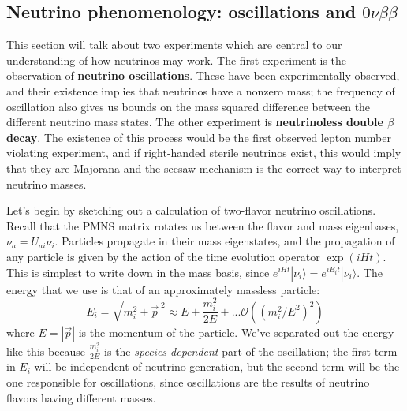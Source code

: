 \documentclass[11pt, oneside]{article}   	%
\theoremstyle{definition}
\numberwithin{equation}{subsection}		%
\begin{document}
\subsection{Neutrino phenomenology: oscillations and $0\nu\beta\beta$}

This section will talk about two experiments which are central to our understanding of how neutrinos may work. The first experiment is the 
observation of \textbf{neutrino oscillations}. These have been experimentally observed, and their existence implies that neutrinos have a nonzero 
mass; the frequency of oscillation also gives us bounds on the mass squared difference between the different neutrino mass states. 
The other experiment is \textbf{neutrinoless double $\beta$ decay}. The existence of this process would be the first observed lepton number violating 
experiment, and if right-handed sterile neutrinos exist, this would imply that they are Majorana and the seesaw mechanism is the correct 
way to interpret neutrino masses. 

Let's begin by sketching out a calculation of two-flavor neutrino oscillations. Recall that the PMNS matrix rotates us between the flavor and mass eigenbases, 
$\nu_a = U_{ai} \nu_i$. Particles propagate in their mass eigenstates, and the propagation of any particle is given by the action of the time evolution 
operator $\exp(i H t)$. This is simplest to write down in the mass basis, since $e^{i Ht} |\nu_i\rangle = e^{i E_i t} |\nu_i\rangle$. The energy that we use 
is that of an approximately massless particle:
\begin{equation}
	E_i = \sqrt{m_i^2 + \vec p^{\; 2}}\approx E + \frac{m_i^2}{2 E} + ... \mathcal O\left(\left(m_i^2 / E^2\right)^2\right)
\end{equation}
where $E = |\vec p|$ is the momentum of the particle. We've separated out the energy like this because $\frac{m_i^2}{2 E}$ is the \textit{species-dependent} 
part of the oscillation; the first term in $E_i$ will be independent of neutrino generation, but the second term will be the one responsible for oscillations, since 
oscillations are the results of neutrino flavors having different masses. 
\end{document}
